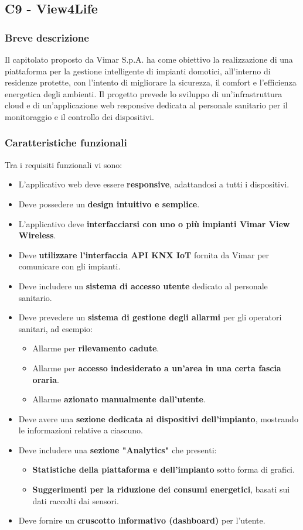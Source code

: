 \documentclass[a4paper,11pt]{article}
\begin{document}
\newpage
\subsection{C9 - View4Life}
\subsubsection{Breve descrizione}
\parbox[t]{\linewidth}{%
Il capitolato proposto da Vimar S.p.A. ha come obiettivo la realizzazione di una piattaforma per la gestione intelligente di impianti domotici, all'interno di residenze protette, con l'intento di migliorare la sicurezza, il comfort e l'efficienza energetica degli ambienti. Il progetto prevede lo sviluppo di un'infrastruttura cloud e di un'applicazione web responsive dedicata al personale sanitario per il monitoraggio e il controllo dei dispositivi.
}
\subsubsection{Caratteristiche funzionali}
Tra i requisiti funzionali vi sono:
\begin{itemize}
  \item L'applicativo web deve essere \textbf{responsive}, adattandosi a tutti i dispositivi.
  \item Deve possedere un \textbf{design intuitivo e semplice}.
  \item L'applicativo deve \textbf{interfacciarsi con uno o più impianti Vimar View Wireless}.
  \item Deve \textbf{utilizzare l'interfaccia API KNX IoT} fornita da Vimar per comunicare con gli impianti.
  \item Deve includere un \textbf{sistema di accesso utente} dedicato al personale sanitario.
  \item Deve prevedere un \textbf{sistema di gestione degli allarmi} per gli operatori sanitari, ad esempio:
  \begin{itemize}
    \item Allarme per \textbf{rilevamento cadute}.
    \item Allarme per \textbf{accesso indesiderato a un'area in una certa fascia oraria}.
    \item Allarme \textbf{azionato manualmente dall'utente}.
  \end{itemize}
  \item Deve avere una \textbf{sezione dedicata ai dispositivi dell'impianto}, mostrando le informazioni relative a ciascuno.
  \item Deve includere una \textbf{sezione "Analytics"} che presenti:
  \begin{itemize}
    \item \textbf{Statistiche della piattaforma e dell'impianto} sotto forma di grafici.
    \item \textbf{Suggerimenti per la riduzione dei consumi energetici}, basati sui dati raccolti dai sensori.
  \end{itemize}
  \item Deve fornire un \textbf{cruscotto informativo (dashboard)} per l'utente.
\end{itemize}
\end{document}
